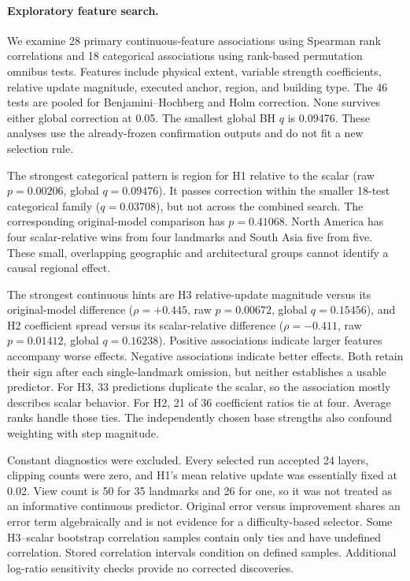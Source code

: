 \paragraph{Exploratory feature search.}
We examine 28 primary continuous-feature associations using Spearman rank correlations and 18 categorical associations using rank-based permutation omnibus tests. Features include physical extent, variable strength coefficients, relative update magnitude, executed anchor, region, and building type. The 46 tests are pooled for Benjamini--Hochberg and Holm correction. None survives either global correction at 0.05. The smallest global BH $q$ is 0.09476. These analyses use the already-frozen confirmation outputs and do not fit a new selection rule.

The strongest categorical pattern is region for H1 relative to the scalar (raw $p=0.00206$, global $q=0.09476$). It passes correction within the smaller 18-test categorical family ($q=0.03708$), but not across the combined search. The corresponding original-model comparison has $p=0.41068$. North America has four scalar-relative wins from four landmarks and South Asia five from five. These small, overlapping geographic and architectural groups cannot identify a causal regional effect.

The strongest continuous hints are H3 relative-update magnitude versus its original-model difference ($\rho=+0.445$, raw $p=0.00672$, global $q=0.15456$), and H2 coefficient spread versus its scalar-relative difference ($\rho=-0.411$, raw $p=0.01412$, global $q=0.16238$). Positive associations indicate larger features accompany worse effects. Negative associations indicate better effects. Both retain their sign after each single-landmark omission, but neither establishes a usable predictor. For H3, 33 predictions duplicate the scalar, so the association mostly describes scalar behavior. For H2, 21 of 36 coefficient ratios tie at four. Average ranks handle those ties. The independently chosen base strengths also confound weighting with step magnitude.

Constant diagnostics were excluded. Every selected run accepted 24 layers, clipping counts were zero, and H1's mean relative update was essentially fixed at 0.02. View count is 50 for 35 landmarks and 26 for one, so it was not treated as an informative continuous predictor. Original error versus improvement shares an error term algebraically and is not evidence for a difficulty-based selector. Some H3--scalar bootstrap correlation samples contain only ties and have undefined correlation. Stored correlation intervals condition on defined samples. Additional log-ratio sensitivity checks provide no corrected discoveries.

